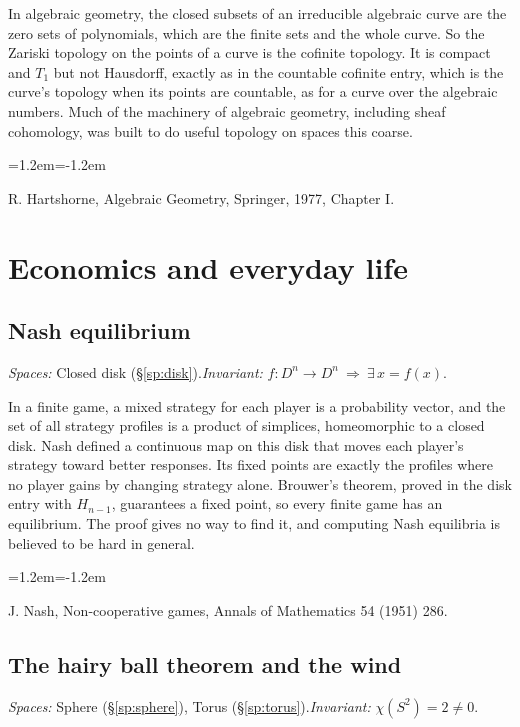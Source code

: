 \documentclass[11pt,twoside]{book}
\begin{document}
In algebraic geometry, the closed subsets of an irreducible algebraic curve are the zero sets of polynomials, which are the finite sets and the whole curve. So the Zariski topology on the points of a curve is the cofinite topology. It is compact and $T_1$ but not Hausdorff, exactly as in the countable cofinite entry, which is the curve's topology when its points are countable, as for a curve over the algebraic numbers. Much of the machinery of algebraic geometry, including sheaf cohomology, was built to do useful topology on spaces this coarse.
\begin{list}{}{\leftmargin=1.2em\itemindent=-1.2em\itemsep=0pt}\small \item R. Hartshorne, Algebraic Geometry, Springer, 1977, Chapter I.\end{list}
\section{Economics and everyday life}
\subsection{Nash equilibrium}\label{app:app-nash}
\noindent\textit{Spaces:} Closed disk (\S\ref{sp:disk}).\enspace\textit{Invariant:} $f:D^n\to D^n\ \Rightarrow\ \exists\,x=f(x)$.

In a finite game, a mixed strategy for each player is a probability vector, and the set of all strategy profiles is a product of simplices, homeomorphic to a closed disk. Nash defined a continuous map on this disk that moves each player's strategy toward better responses. Its fixed points are exactly the profiles where no player gains by changing strategy alone. Brouwer's theorem, proved in the disk entry with $H_{n-1}$, guarantees a fixed point, so every finite game has an equilibrium. The proof gives no way to find it, and computing Nash equilibria is believed to be hard in general.
\begin{list}{}{\leftmargin=1.2em\itemindent=-1.2em\itemsep=0pt}\small \item J. Nash, Non-cooperative games, Annals of Mathematics 54 (1951) 286.\end{list}
\subsection{The hairy ball theorem and the wind}\label{app:app-hairy}
\noindent\textit{Spaces:} Sphere (\S\ref{sp:sphere}), Torus (\S\ref{sp:torus}).\enspace\textit{Invariant:} $\chi(S^2)=2\ne0$.
\end{document}
